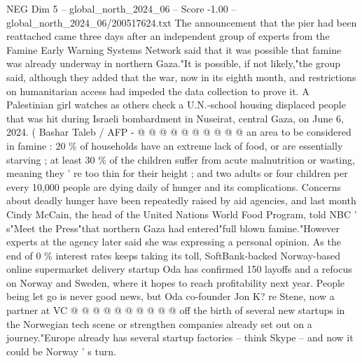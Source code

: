 \begin{textsample}{NEG Dim 5 – global\_north\_2024\_06 – Score -1.00 – global\_north\_2024\_06/200517624.txt}
The announcement that the pier had been reattached came three days after an independent group of experts from the Famine Early Warning Systems Network said that it was possible that famine was already underway in northern Gaza."It is possible, if not likely,"the group said, although they added that the war, now in its eighth month, and restrictions on humanitarian access had impeded the data collection to prove it.
A Palestinian girl watches as others check a U.N.-school housing displaced people that was hit during Israeli bombardment in Nuseirat, central Gaza, on June 6, 2024. ( Bashar Taleb / AFP - @ @ @ @ @ @ @ @ @ @ an area to be considered in famine : 20 \% of households have an extreme lack of food, or are essentially starving ; at least 30 \% of the children suffer from acute malnutrition or wasting, meaning they ' re too thin for their height ; and two adults or four children per every 10,000 people are dying daily of hunger and its complications.
Concerns about deadly hunger have been repeatedly raised by aid agencies, and last month Cindy McCain, the head of the United Nations World Food Program, told NBC ' s"Meet the Press"that northern Gaza had entered"full blown famine."However experts at the agency later said she was expressing a personal opinion.
As the end of 0 \% interest rates keeps taking its toll, SoftBank-backed Norway-based online supermarket delivery startup Oda has confirmed 150 layoffs and a refocus on Norway and Sweden, where it hopes to reach profitability next year.
People being let go is never good news, but Oda co-founder Jon K? re Stene, now a partner at VC @ @ @ @ @ @ @ @ @ @ off the birth of several new startups in the Norwegian tech scene or strengthen companies already set out on a journey."Europe already has several startup factories -- think Skype -- and now it could be Norway ' s turn.

\end{textsample}
